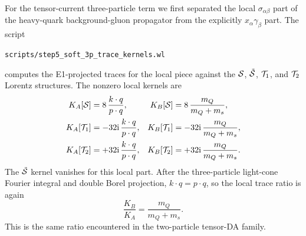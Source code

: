 \documentclass[11pt]{article}
\newcommand{\ii}{\mathrm{i}}
\begin{document}
For the tensor-current three-particle term we first separated the local
$\sigma_{\alpha\beta}$ part of the heavy-quark background-gluon propagator from
the explicitly $x_\alpha\gamma_\beta$ part.  The script
\begin{center}
  \texttt{scripts/step5\_soft\_3p\_trace\_kernels.wl}
\end{center}
computes the E1-projected traces for the local piece against the
${\cal S}$, $\tilde{\cal S}$, ${\cal T}_1$, and ${\cal T}_2$ Lorentz
structures.  The nonzero local kernels are
\begin{align}
  K_A[{\cal S}]&=8\,\frac{k\cdot q}{p\cdot q},
  &
  K_B[{\cal S}]&=8\,\frac{m_Q}{m_Q+m_s},\\
  K_A[{\cal T}_1]&=-32\ii\,\frac{k\cdot q}{p\cdot q},
  &
  K_B[{\cal T}_1]&=-32\ii\,\frac{m_Q}{m_Q+m_s},\\
  K_A[{\cal T}_2]&=+32\ii\,\frac{k\cdot q}{p\cdot q},
  &
  K_B[{\cal T}_2]&=+32\ii\,\frac{m_Q}{m_Q+m_s}.
\end{align}
The $\tilde{\cal S}$ kernel vanishes for this local part.  After the
three-particle light-cone Fourier integral and double Borel projection,
$k\cdot q=p\cdot q$, so the local trace ratio is again
\begin{equation}
  \frac{K_B}{K_A}
  =
  \frac{m_Q}{m_Q+m_s}.
\end{equation}
This is the same ratio encountered in the two-particle tensor-DA family.
\end{document}
